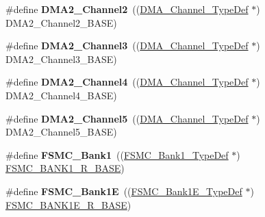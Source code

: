 \begin{DoxyCompactItemize}
\item 
\hypertarget{group___peripheral__declaration_ga316024020799373b9d8e35c316c74f24}{\#define {\bfseries D\-M\-A2\-\_\-\-Channel2}~((\hyperlink{struct_d_m_a___channel___type_def}{D\-M\-A\-\_\-\-Channel\-\_\-\-Type\-Def} $\ast$) D\-M\-A2\-\_\-\-Channel2\-\_\-\-B\-A\-S\-E)}\label{group___peripheral__declaration_ga316024020799373b9d8e35c316c74f24}

\item 
\hypertarget{group___peripheral__declaration_ga6dca52a79587e0ca9a5d669048b4c7eb}{\#define {\bfseries D\-M\-A2\-\_\-\-Channel3}~((\hyperlink{struct_d_m_a___channel___type_def}{D\-M\-A\-\_\-\-Channel\-\_\-\-Type\-Def} $\ast$) D\-M\-A2\-\_\-\-Channel3\-\_\-\-B\-A\-S\-E)}\label{group___peripheral__declaration_ga6dca52a79587e0ca9a5d669048b4c7eb}

\item 
\hypertarget{group___peripheral__declaration_ga612b396657695191ad740b0b59bc9f12}{\#define {\bfseries D\-M\-A2\-\_\-\-Channel4}~((\hyperlink{struct_d_m_a___channel___type_def}{D\-M\-A\-\_\-\-Channel\-\_\-\-Type\-Def} $\ast$) D\-M\-A2\-\_\-\-Channel4\-\_\-\-B\-A\-S\-E)}\label{group___peripheral__declaration_ga612b396657695191ad740b0b59bc9f12}

\item 
\hypertarget{group___peripheral__declaration_ga521c13b7d0f82a6897d47995da392750}{\#define {\bfseries D\-M\-A2\-\_\-\-Channel5}~((\hyperlink{struct_d_m_a___channel___type_def}{D\-M\-A\-\_\-\-Channel\-\_\-\-Type\-Def} $\ast$) D\-M\-A2\-\_\-\-Channel5\-\_\-\-B\-A\-S\-E)}\label{group___peripheral__declaration_ga521c13b7d0f82a6897d47995da392750}

\item 
\hypertarget{group___peripheral__declaration_ga2a759bad07fe730c99f9e1490e646220}{\#define {\bfseries F\-S\-M\-C\-\_\-\-Bank1}~((\hyperlink{struct_f_s_m_c___bank1___type_def}{F\-S\-M\-C\-\_\-\-Bank1\-\_\-\-Type\-Def} $\ast$) \hyperlink{group___peripheral__memory__map_ga48d8f80d608b64cb42e7ed223066f856}{F\-S\-M\-C\-\_\-\-B\-A\-N\-K1\-\_\-\-R\-\_\-\-B\-A\-S\-E})}\label{group___peripheral__declaration_ga2a759bad07fe730c99f9e1490e646220}

\item 
\hypertarget{group___peripheral__declaration_ga422986101f42a8811ae89ac69deb2759}{\#define {\bfseries F\-S\-M\-C\-\_\-\-Bank1\-E}~((\hyperlink{struct_f_s_m_c___bank1_e___type_def}{F\-S\-M\-C\-\_\-\-Bank1\-E\-\_\-\-Type\-Def} $\ast$) \hyperlink{group___peripheral__memory__map_gaa2ebab683a214fe3b0c628228bff3724}{F\-S\-M\-C\-\_\-\-B\-A\-N\-K1\-E\-\_\-\-R\-\_\-\-B\-A\-S\-E})}\label{group___peripheral__declaration_ga422986101f42a8811ae89ac69deb2759}


\end{DoxyCompactItemize}
